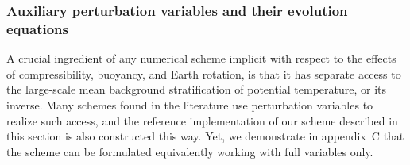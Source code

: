 \documentclass{ametsoc}
\newcommand{\sblue}[1]{\textcolor{sblue}{#1}}
\newcommand{\revision}[1]{\sblue{#1}}
\theoremstyle{definition}
\begin{document}

\subsubsection{Auxiliary perturbation variables and their evolution equations}
\label{sssec:AuxPerturbationVariables}

A crucial ingredient of any numerical scheme implicit with respect to the effects of compressibility, buoyancy, and Earth rotation, \revision{is that it has separate access to the large-scale mean background stratification of potential temperature, or its inverse. Many schemes found in the literature use perturbation variables to realize such access, and the reference implementation of our scheme described in this section is also constructed this way. Yet, we demonstrate in appendix~C that the scheme can be formulated equivalently working with full variables only.} 
\end{document}
